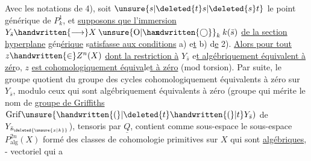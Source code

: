  Avec les notations de 4),  soit $\unsure{s|\deleted{t}s|\deleted{s}t}$ le point générique de $P^1_k$, et \uline{supposons que l'immersion} $Y_{\bar s}\handwritten{\longrightarrow}X\mathbin{\ooalign{\hfil$\mathrm{x}$\hfil\cr\hfil$\unsure{\mathrm{O}|\handwritten{\bigcirc}}$\hfil\cr}}_k k(\bar s)$ \uline{de la section hyperplane} gén\uline{érique}  s\uline{atisfasse aux conditions} a) e\uline{t} b) d\uline{e} 2). \uline{Alors pour tout} $z\handwritten{\in}Z^n(X)$ \uline{dont la restriction à} $Y_{\bar s}$ e\uline{t algébriquement équivalent à zér}o, $z$ \uline{est cohomologiquement équiva}le\uline{t à zéro} (mod torsion).  Par suite, le groupe quotient du groupe des cycles cohomologiquement équivalents à zéro  sur $Y_{\bar s}$, modulo ceux qui sont algébriquement équivalents à zéro (groupe qui mérite le nom de \uline{groupe de Griffiths} $\mathrm{Grif}\unsure{\handwritten{(}|\deleted{t}\handwritten{(}|t}Y_{\bar s})$ de $Y_{\bar s_{\deleted{\unsure{x|k}}}}$), tensoris par $\underline{Q}$, contient comme sous-espace le sous-espace $P^{2n}_{\mathrm{alg}}(X)$ formé des classes de cohomologie primitives sur $X$ qui sont \uline{algébriques}, - vectoriel qui a
